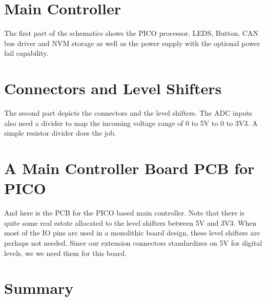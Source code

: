 \section{Main Controller}

The first part of the schematics shows the PICO processor, LEDS, Button, CAN bus driver and NVM storage as well as the power supply with the optional power fail capability.


\section{Connectors and Level Shifters}

The second part depicts the connectors and the level shifters. The ADC inputs also need a divider to map the incoming voltage range of 0 to 5V to 0 to 3V3. A simple resistor divider does the job.


\section{A Main Controller Board PCB for PICO}

And here is the PCB for the PICO based main controller. Note that there is quite some real estate allocated to the level shifters between 5V and 3V3. When most of the IO pins are used in a monolithic board design, these level shifters are perhaps not needed. Since our extension connectors standardizes on 5V for digital levels, we we need them for this board.


\section{Summary}

